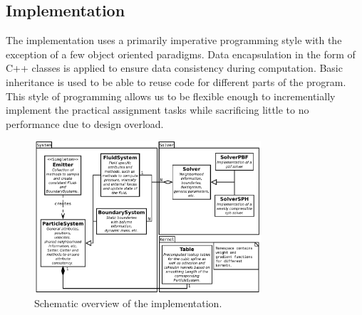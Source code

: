 \documentclass[11pt, letterpaper, twocolumn]{article}
\begin{document}


\subsection{Implementation}
The implementation uses a primarily imperative programming style with the exception of a few object oriented paradigms. Data encapsulation in the form of C++ classes is applied to ensure data consistency during computation. Basic inheritance is used to be able to reuse code for different parts of the program. This style of programming allows us to be flexible enough to incrementially implement the practical assignment tasks while sacrificing little to no performance due to design overload.
\begin{figure}[ht]
    \centering
    \includegraphics[width=0.75\textwidth]{images/system.pdf}
    \caption{Schematic overview of the implementation.}
    \label{fig:systemuml}
\end{figure}
\end{document}
